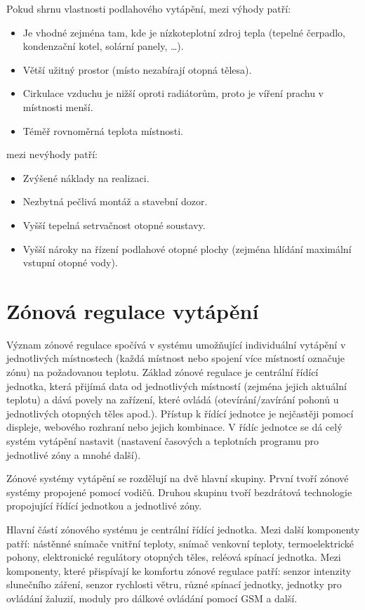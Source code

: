 Pokud shrnu vlastnosti podlahového vytápění, mezi výhody patří:

\begin{itemize}
  \item Je vhodné zejména tam, kde je nízkoteplotní zdroj tepla (tepelné čerpadlo, kondenzační kotel, solární panely, …).
  \item Větší užitný prostor (místo nezabírají otopná tělesa).
  \item Cirkulace vzduchu je nižší oproti radiátorům, proto je víření prachu v místnosti menší.
  \item Téměř rovnoměrná teplota místnosti.
\end{itemize}

mezi nevýhody patří:

\begin{itemize}
  \item Zvýšené náklady na realizaci.
  \item Nezbytná pečlivá montáž a stavební dozor.
  \item Vyšší tepelná setrvačnost otopné soustavy.
  \item Vyšší nároky na řízení podlahové otopné plochy (zejména hlídání maximální vstupní otopné vody).
\end{itemize}


\section{Zónová regulace vytápění}

Význam zónové regulace spočívá v systému umožňující individuální vytápění v jednotlivých místnostech (každá místnost nebo spojení více místností označuje zónu) na požadovanou teplotu.  Základ zónové regulace je centrální řídící jednotka, která přijímá data od jednotlivých místností (zejména jejich aktuální teplotu) a dává povely na zařízení, které ovládá (otevírání/zavírání pohonů u jednotlivých otopných těles apod.). Přístup k řídící jednotce je nejčastěji pomocí displeje, webového rozhraní nebo jejich kombinace. V řídíc jednotce se dá celý systém vytápění nastavit (nastavení časových a teplotních programu pro jednotlivé zóny a mnohé další). 

Zónové systémy vytápění se rozdělují na dvě hlavní skupiny. První tvoří zónové systémy propojené pomocí vodičů. Druhou skupinu tvoří bezdrátová technologie propojující řídící jednotkou a jednotlivé zóny. 

Hlavní částí zónového systému je centrální řídící jednotka. Mezi další komponenty patří: nástěnné snímače vnitřní teploty, snímač venkovní teploty, termoelektrické pohony, elektronické regulátory otopných těles, reléová spínací jednotka. Mezi komponenty, které přispívají ke komfortu zónové regulace patří: senzor intenzity slunečního záření, senzor rychlosti větru, různé spínací jednotky, jednotky pro ovládání žaluzií, moduly pro dálkové ovládání pomocí GSM a další.
